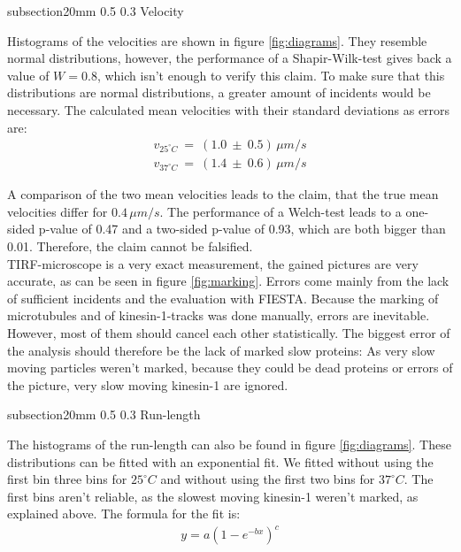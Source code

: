 \documentclass[english, %
parskip=full, %
bibliography=totoc, %
]{scrartcl}
\makeatletter
\renewcommand\subsection{\@startsection 
   {subsection}{2}{0mm}%
   {0.5\baselineskip}%
   {0.3\baselineskip}%
   {\bfseries\sffamily\large}%
   }
\makeatother
\begin{document}
\subsection{Velocity}

Histograms of the velocities are shown in figure \ref{fig:diagrams}. They resemble normal distributions, however, the performance of a Shapir-Wilk-test gives back a value of $W = 0.8$, which isn't enough to verify this claim. To make sure that this distributions are normal distributions, a greater amount of incidents would be necessary. The calculated mean velocities with their standard deviations as errors are:
\begin{align*}
v _{25^\circ C} \ = \ (1.0 \ \pm \ 0.5) \, \mu m/s \\
v _{37^\circ C} \ = \ (1.4 \ \pm \ 0.6) \, \mu m/s
\end{align*}

A comparison of the two mean velocities leads to the claim, that the true mean velocities differ for $0.4\, \mu m/s$. The performance of a Welch-test leads to a one-sided p-value of 0.47 and a two-sided p-value of 0.93, which are both bigger than 0.01. Therefore, the claim cannot be falsified. \\
TIRF-microscope is a very exact measurement, the gained pictures are very accurate, as can be seen in figure \ref{fig:marking}. Errors come mainly from the lack of sufficient incidents and the evaluation with FIESTA. Because the marking of microtubules and of kinesin-1-tracks was done manually, errors are inevitable. However, most of them should cancel each other statistically. The biggest error of the analysis should therefore be the lack of marked slow proteins: As very slow moving particles weren't marked, because they could be dead proteins or errors of the picture, very slow moving kinesin-1 are ignored.

\subsection{Run-length}

The histograms of the run-length can also be found in figure \ref{fig:diagrams}. These distributions can be fitted with an exponential fit. We fitted without using the first bin three bins for $25^\circ C$ and without using the first two bins for $37^\circ C$. The first bins aren't reliable, as the slowest moving kinesin-1 weren't marked, as explained above. The formula for the fit is:
\begin{align*}
y = a (1 - e^{-bx})^c
\end{align*}
\end{document}
